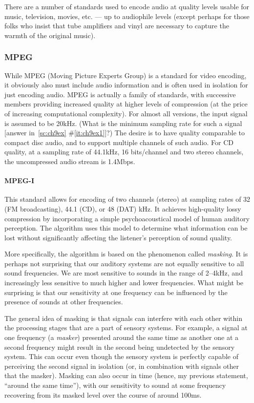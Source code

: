 There are a number of standards used to encode audio at quality levels 
usable for music, television, movies, etc. --- up to audiophile levels 
(except perhaps for those folks who insist that tube amplifiers and
vinyl are necessary to capture the warmth of the original music).  

\subsubsection{MPEG}

While MPEG (Moving Picture Experts Group) is a standard for video
encoding, it obviously also must include audio information and is
often used in isolation for just encoding audio. MPEG is actually a
family of standards, with successive members providing increased
quality at higher levels of compression (at the price of increasing
computational complexity). For almost all versions, the input signal
is assumed to be 20kHz. (What is the minimum sampling rate for such a
signal [answer in~\ref{sc:ch9ex}
\#\ref{it:ch9ex1}]?) The desire is to have quality
comparable to compact disc audio, and to support multiple channels of
such audio. For CD quality, at a sampling rate of 44.1kHz, 16
bits/channel and two stereo channels, the uncompressed audio stream is 
1.4Mbps.

\paragraph*{MPEG-I}
This standard allows for encoding of two channels (stereo) at sampling
rates of 32 (FM broadcasting), 44.1 (CD), or 48 (DAT) kHz. It achieves
high-quality lossy compression by incorporating a simple
psychoacoustical model of human auditory perception. The algorithm
uses this model to determine what information can be lost without
significantly affecting the listener's perception of sound quality.

More specifically, the algorithm is based on the phenomenon called
\emph{masking}. It is perhaps not surprising that our auditory systems 
are not equally sensitive to all sound frequencies.  We are most
sensitive to sounds in the range of 2--4kHz, and increasingly less
sensitive to much higher and lower frequencies. What might be
surprising is that our sensitivity at one frequency can be influenced
by the presence of sounds at other frequencies.

The general idea of masking is that signals can interfere with each
other within the processing stages that are a part of sensory
systems. For example, a signal at one frequency (a
\emph{masker}) presented around the same time as another one at a
second frequency might result in the second being undetected by the
sensory system.  This can occur even though the sensory system is
perfectly capable of perceiving the second signal in isolation (or, in
combination with signals other that the masker). Masking can also
occur in time (hence, my previous statement, ``around the same
time''), with our sensitivity to sound at some frequency recovering
from its masked level over the course of around 100ms.

